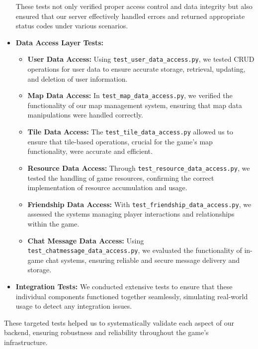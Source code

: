 \documentclass[12pt]{article}
\begin{document}
\begin{itemize}
\begin{itemize}
        \end{itemize}
    These tests not only verified proper access control and data integrity but also ensured that our server effectively handled errors and returned appropriate status codes under various scenarios.
    \item \textbf{Data Access Layer Tests:}
    \begin{itemize}
        \item \textbf{User Data Access:} Using \texttt{test\_user\_data\_access.py}, we tested CRUD operations for user data to ensure accurate storage, retrieval, updating, and deletion of user information.
        \item \textbf{Map Data Access:} In \texttt{test\_map\_data\_access.py}, we verified the functionality of our map management system, ensuring that map data manipulations were handled correctly.
        \item \textbf{Tile Data Access:} The \texttt{test\_tile\_data\_access.py} allowed us to ensure that tile-based operations, crucial for the game's map functionality, were accurate and efficient.
        \item \textbf{Resource Data Access:} Through \texttt{test\_resource\_data\_access.py}, we tested the handling of game resources, confirming the correct implementation of resource accumulation and usage.
        \item \textbf{Friendship Data Access:} With \texttt{test\_friendship\_data\_access.py}, we assessed the systems managing player interactions and relationships within the game.
        \item \textbf{Chat Message Data Access:} Using \texttt{test\_chatmessage\_data\_access.py}, we evaluated the functionality of in-game chat systems, ensuring reliable and secure message delivery and storage.
    \end{itemize}
    \item \textbf{Integration Tests:} We conducted extensive tests to ensure that these individual components functioned together seamlessly, simulating real-world usage to detect any integration issues.
\end{itemize}
These targeted tests helped us to systematically validate each aspect of our backend, ensuring robustness and reliability throughout the game's infrastructure.
\end{document}
